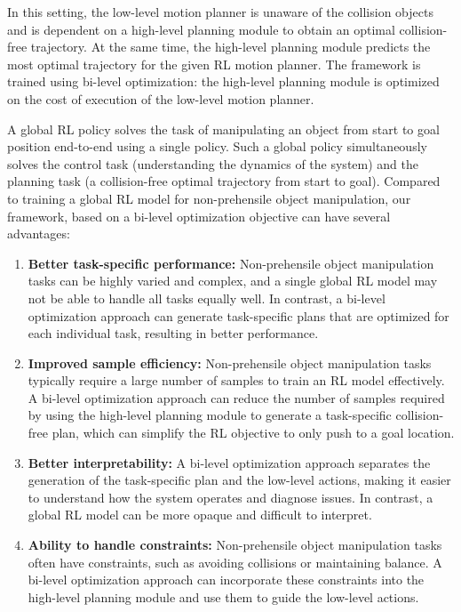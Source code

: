 In this setting, the low-level motion planner is unaware of the collision objects and is dependent on a high-level planning module to obtain an optimal collision-free trajectory. At the same time, the high-level planning module predicts the most optimal trajectory for the given RL motion planner. The framework is trained using bi-level optimization: the high-level planning module is optimized on the cost of execution of the low-level motion planner. 

A global RL policy solves the task of manipulating an object from start to goal position end-to-end using a single policy. Such a global policy simultaneously solves the control task (understanding the dynamics of the system) and the planning task (a collision-free optimal trajectory from start to goal). 
Compared to training a global RL model for non-prehensile object manipulation, our framework, based on a bi-level optimization objective can have several advantages: 

\begin{enumerate}
    \item \textbf{Better task-specific performance:} Non-prehensile object manipulation tasks can be highly varied and complex, and a single global RL model may not be able to handle all tasks equally well. In contrast, a bi-level optimization approach can generate task-specific plans that are optimized for each individual task, resulting in better performance. 
    \item \textbf{Improved sample efficiency:} Non-prehensile object manipulation tasks typically require a large number of samples to train an RL model effectively. A bi-level optimization approach can reduce the number of samples required by using the high-level planning module to generate a task-specific collision-free plan, which can simplify the RL objective to only push to a goal location. 
    \item \textbf{Better interpretability:} A bi-level optimization approach separates the generation of the task-specific plan and the low-level actions, making it easier to understand how the system operates and diagnose issues. In contrast, a global RL model can be more opaque and difficult to interpret. 
    \item \textbf{Ability to handle constraints:} Non-prehensile object manipulation tasks often have constraints, such as avoiding collisions or maintaining balance. A bi-level optimization approach can incorporate these constraints into the high-level planning module and use them to guide the low-level actions. 
\end{enumerate}

